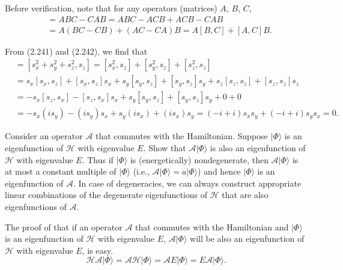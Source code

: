 \documentclass[a4paper]{book}
\newcounter{exercise}[chapter]
\newcounter{solution}[chapter]
\begin{document}
	\begin{solution}
	
	Before verification, note that for any operators (matrices) $A$, $B$, $C$,
	\begin{align*}
		[AB,C] &= ABC - CAB = ABC - ACB + ACB - CAB \\
		&= A( BC - CB ) + ( AC - CA )B = A[B,C] + [A,C]B.
	\end{align*}

	From (2.241) and (2.242), we find that
	\begin{align*}
		[s^2, s_z] &= [ s^2_x + s^2_y + s^2_z , s_z ] = [ s^2_x , s_z ] + [ s^2_y , s_z ] + [ s^2_z , s_z ] \\
		&= s_x [ s_x , s_z ] + [ s_x , s_z ] s_x + s_y [ s_y , s_z ] + [ s_y , s_z ] s_y + s_z [ s_z , s_z ] + [ s_z , s_z ] s_z \\
		&= - s_x [ s_z , s_x ] - [ s_z , s_x ] s_x + s_y [ s_y , s_z ] + [ s_y , s_z ] s_y + 0 + 0 \\
		&= - s_x ( i s_y ) - ( i s_y ) s_x + s_y ( i s_x ) + ( i s_x ) s_y = ( -i + i ) s_x s_y + ( -i + i ) s_y s_x = 0.
	\end{align*}

	\end{solution}
	
	\begin{exercise}
	Consider an operator $\mathscr{A}$ that commutes with the Hamiltonian. Suppose $|\Phi\rangle$ is an eigenfunction of $\mathscr{H}$ with eigenvalue $E$. Show that $\mathscr{A}|\Phi\rangle$ is also an eigenfunction of $\mathscr{H}$ with eigenvalue $E$. Thus if $|\Phi\rangle$ is (energetically) nondegenerate, then $\mathscr{A}|\Phi\rangle$ is at most a constant multiple of $|\Phi\rangle$ (i.e., $\mathscr{A}|\Phi\rangle = a|\Phi\rangle$) and hence $|\Phi\rangle$ is an eigenfunction of $\mathscr{A}$. In case of degeneracies, we can always construct appropriate linear combinations of the degenerate eigenfunctions of $\mathscr{H}$ that are also eigenfunctions of $\mathscr{A}$.
	\end{exercise}
	
	\begin{solution}
	
	The proof of that if an operator $\mathscr{A}$ that commutes with the Hamiltonian and $|\Phi\rangle$ is an eigenfunction of $\mathscr{H}$ with eigenvalue $E$, $\mathscr{A}|\Phi\rangle$ will be also an eigenfunction of $\mathscr{H}$ with eigenvalue $E$, is easy.
	\[
		\mathscr{H} \mathscr{A} |\Phi\rangle = \mathscr{A} \mathscr{H} |\Phi\rangle = \mathscr{A} E |\Phi\rangle = E \mathscr{A} |\Phi\rangle .
	\]
	
	\end{solution}
	
\end{document}
